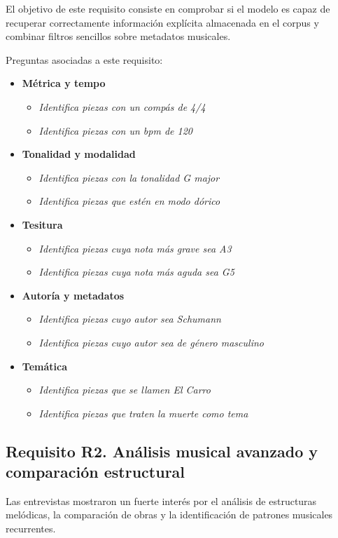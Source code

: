 El objetivo de este requisito consiste en comprobar si el modelo es capaz de recuperar correctamente información explícita almacenada en el corpus y combinar filtros sencillos sobre metadatos musicales.

Preguntas asociadas a este requisito:
\begin{itemize}
    \item \textbf{Métrica y tempo}
    \begin{itemize}
    \item \textit{Identifica piezas con un compás de 4/4}
    \item \textit{Identifica piezas con un bpm de 120}
    \end{itemize}
    \item \textbf{Tonalidad y modalidad}
    \begin{itemize}
    \item \textit{Identifica piezas con la tonalidad G major}
    \item \textit{Identifica piezas que estén en modo dórico}
    \end{itemize}
    \item \textbf{Tesitura}
    \begin{itemize}
    \item \textit{Identifica piezas cuya nota más grave sea A3}
    \item \textit{Identifica piezas cuya nota más aguda sea G5}
    \end{itemize}
    \item \textbf{Autoría y metadatos}
    \begin{itemize}
    \item \textit{Identifica piezas cuyo autor sea Schumann}
    \item \textit{Identifica piezas cuyo autor sea de género masculino}
    \end{itemize}
    \item \textbf{Temática}
    \begin{itemize}
    \item \textit{Identifica piezas que se llamen El Carro}
    \item \textit{Identifica piezas que traten la muerte como tema}
    \end{itemize}
\end{itemize}

\subsection{Requisito R2. Análisis musical avanzado y comparación estructural}
Las entrevistas mostraron un fuerte interés por el análisis de estructuras melódicas, la comparación de obras y la identificación de patrones musicales recurrentes.

